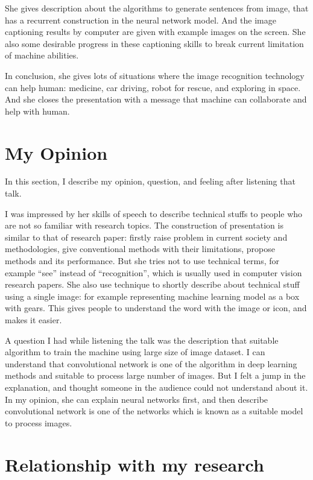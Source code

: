 \documentclass[letter, twocolumn]{ieeeconf}
\begin{document}
She gives description about the algorithms to generate sentences from image,
that has a recurrent construction in the neural network model.
And the image captioning results by computer are given with example images on the screen.
She also some desirable progress in these captioning skills to break current limitation
of machine abilities.

In conclusion, she gives lots of situations where the image recognition technology can help human:
medicine, car driving, robot for rescue, and exploring in space.
And she closes the presentation with a message that machine can collaborate and help with human.

\section{My Opinion}

In this section, I describe my opinion, question, and feeling after listening that talk.

I was impressed by her skills of speech to describe technical stuffs to people
who are not so familiar with research topics.
The construction of presentation is similar to that of research paper: firstly raise problem
in current society and methodologies, give conventional methods with their limitations,
propose methods and its performance.
But she tries not to use technical terms, for example ``see'' instead of ``recognition'',
which is usually used in computer vision research papers.
She also use technique to shortly describe about technical stuff using a single image:
for example representing machine learning model as a box with gears.
This gives people to understand the word with the image or icon, and makes it easier.

A question I had while listening the talk was the description that
suitable algorithm to train the machine using large size of image dataset.
I can understand that convolutional network is one of the algorithm in deep learning methods
and suitable to process large number of images.
But I felt a jump in the explanation, and thought someone in the audience could not understand
about it. In my opinion, she can explain neural networks first,
and then describe convolutional network is one of the networks
which is known as a suitable model to process images.

\section{Relationship with my research}
\end{document}
